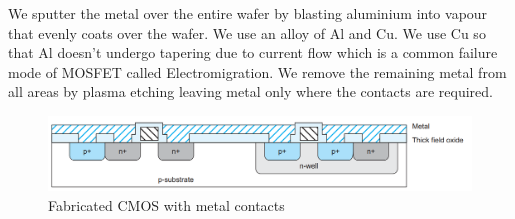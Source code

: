 \noindent We sputter the metal over the entire wafer by blasting aluminium into vapour that evenly coats over the wafer. We use an alloy of Al and Cu. We use Cu so that Al doesn’t undergo tapering due to current flow which is a common failure mode of MOSFET called Electromigration. We remove the remaining metal from all areas by plasma etching leaving metal only where the contacts are required.
\begin{figure}[H]
\centering
\includegraphics[scale=0.3]{./fig20} %
\caption{Fabricated CMOS with metal contacts}
\label{3.20} %
\end{figure}







